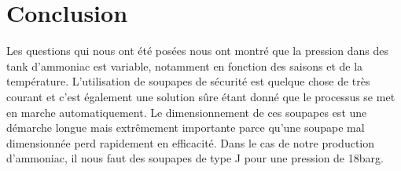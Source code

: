 \section{Conclusion}
Les questions qui nous ont été posées nous ont montré que la pression dans des tank d'ammoniac est variable, notamment en fonction des saisons et de la température. L'utilisation de soupapes de sécurité est quelque chose de très courant et c'est également une solution sûre étant donné que le processus se met en marche automatiquement. Le dimensionnement de ces soupapes est une démarche longue mais extrêmement importante parce qu'une soupape mal dimensionnée perd rapidement en efficacité. Dans le cas de notre production d'ammoniac, il nous faut des soupapes de type J pour une pression de \unit{18}{barg}.
